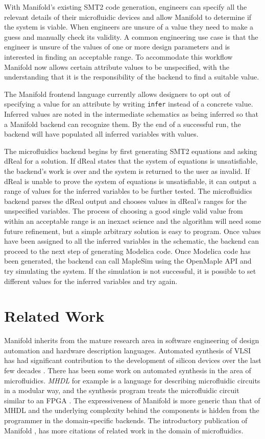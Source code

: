 With Manifold's existing SMT2 code generation, engineers can specify all the
relevant details of their microfluidic devices and allow Manifold to determine if the system is viable. When engineers
are unsure of a value they need to make a guess and manually check its
validity. A common engineering use case is that the engineer is unsure of the
values of one or more design parameters and is interested in finding an
acceptable range. To accommodate this workflow Manifold now allows certain
attribute values to be unspecified, with the understanding that it is the
responsibility of the backend to find a suitable value.

The Manifold frontend language currently allows designers to opt out of
specifying a value for an attribute by writing {\tt infer} instead of a
concrete value. Inferred values are noted in the intermediate schematics as
being inferred so that a Manifold backend can recognize them.
By the end of a successful run, the backend will have populated all inferred variables with values.

The microfluidics backend begins by first generating SMT2 equations and asking dReal for a solution.
If dReal states that the system of equations is unsatisfiable, the backend's work is over and the system is returned to the user as invalid.
If dReal is unable to prove the system of equations is unsatisfiable, it can output a range of values for the inferred variables to be further tested.
The microfluidics backend parses the dReal output and chooses values in dReal's ranges for the unspecified variables.
The process of choosing a good single valid value from within an acceptable range is an inexact science and the algorithm will need some future refinement, but a simple arbitrary solution is easy to program.
Once values have been assigned to all the inferred variables in the schematic, the backend can proceed to the next step of generating Modelica code.
Once Modelica code has been generated, the backend can call MapleSim using the OpenMaple API and try simulating the system.
If the simulation is not successful, it is possible to set different values for the inferred variables and try again.

\section{Related Work}

Manifold inherits from the mature research area in software engineering of design automation and hardware description languages.
Automated synthesis of VLSI has had significant contribution to the development of silicon devices over the last few decades \cite{MeadConway80}.
There has been some work on automated synthesis in the area of microfluidics.
\emph{MHDL} for example is a language for describing microfluidic circuits in a modular way, and the synthesis program treats the microfluidic circuit similar to an FPGA \cite{McDaniel13aspdac}.
The expressiveness of Manifold is more generic than that of MHDL and the underlying complexity behind the components is hidden from the programmer in the domain-specific backends.
The introductory publication of Manifold \cite{Berzish16cascon}, has more citations of related work in the domain of microfluidics.

